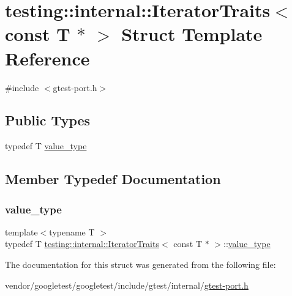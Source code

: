 \hypertarget{structtesting_1_1internal_1_1_iterator_traits_3_01const_01_t_01_5_01_4}{}\section{testing\+:\+:internal\+:\+:Iterator\+Traits$<$ const T $\ast$ $>$ Struct Template Reference}
\label{structtesting_1_1internal_1_1_iterator_traits_3_01const_01_t_01_5_01_4}


{\ttfamily \#include $<$gtest-\/port.\+h$>$}

\subsection*{Public Types}
\begin{DoxyCompactItemize}
\item 
typedef T \hyperlink{structtesting_1_1internal_1_1_iterator_traits_3_01const_01_t_01_5_01_4_ae7c8867223e106f374b56a7dc4a85547}{value\+\_\+type}
\end{DoxyCompactItemize}


\subsection{Member Typedef Documentation}
\mbox{\label{structtesting_1_1internal_1_1_iterator_traits_3_01const_01_t_01_5_01_4_ae7c8867223e106f374b56a7dc4a85547}} 
\subsubsection{\texorpdfstring{value\+\_\+type}{value\_type}}
{\footnotesize\ttfamily template$<$typename T $>$ \\
typedef T \hyperlink{structtesting_1_1internal_1_1_iterator_traits}{testing\+::internal\+::\+Iterator\+Traits}$<$ const T $\ast$ $>$\+::\hyperlink{structtesting_1_1internal_1_1_iterator_traits_3_01const_01_t_01_5_01_4_ae7c8867223e106f374b56a7dc4a85547}{value\+\_\+type}}



The documentation for this struct was generated from the following file\+:\begin{DoxyCompactItemize}
\item 
vendor/googletest/googletest/include/gtest/internal/\hyperlink{gtest-port_8h}{gtest-\/port.\+h}\end{DoxyCompactItemize}
